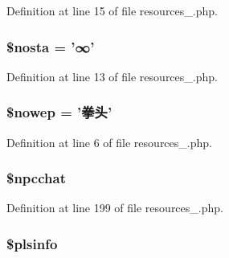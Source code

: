 Definition at line 15 of file resources\+\_.\+php.

\hypertarget{cache_2resources__1_8php_a1b178dce2c8c7c1f35b20c828d51de4a}{
\subsubsection[{\$nosta}]{\setlength{\rightskip}{0pt plus 5cm}\$nosta = '∞'}}\label{cache_2resources__1_8php_a1b178dce2c8c7c1f35b20c828d51de4a}


Definition at line 13 of file resources\+\_.\+php.

\hypertarget{cache_2resources__1_8php_a413d4ee11837afa83d33b1cd34244911}{
\subsubsection[{\$nowep}]{\setlength{\rightskip}{0pt plus 5cm}\$nowep = '拳头'}}\label{cache_2resources__1_8php_a413d4ee11837afa83d33b1cd34244911}


Definition at line 6 of file resources\+\_.\+php.

\hypertarget{cache_2resources__1_8php_a413262abf345c0466e9927a412571365}{
\subsubsection[{\$npcchat}]{\setlength{\rightskip}{0pt plus 5cm}\$npcchat}}\label{cache_2resources__1_8php_a413262abf345c0466e9927a412571365}


Definition at line 199 of file resources\+\_.\+php.

\hypertarget{cache_2resources__1_8php_a80fc03ebf0cae6b56b4e8f4738273199}{
\subsubsection[{\$plsinfo}]{\setlength{\rightskip}{0pt plus 5cm}\$plsinfo}}\label{cache_2resources__1_8php_a80fc03ebf0cae6b56b4e8f4738273199}


